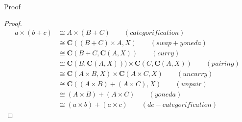 \documentclass[tikz]{beamer}
\theoremstyle{definition}
\begin{document}
\begin{frame}{Proof}
 \begin{proof}{}
 \begin{align*}
     a \times (b + c) &\cong A \times (B + C) \qquad (categorification) \\
                      &\cong \mathbf{C}((B + C) \times A, X) \qquad (swap + yoneda) \\
                      &\cong \mathbf{C}(B + C, \mathbf{C}(A, X)) \qquad (curry)\\
                      &\cong \mathbf{C}(B, \mathbf{C}(A, X)))   \times \mathbf{C}(C, \mathbf{C}(A, X)) \qquad (pairing) \\
                      &\cong \mathbf{C}(A\times B, X) \times \mathbf{C}(A\times C, X) \qquad (uncurry) \\
                      &\cong \mathbf{C}((A \times B) + (A \times C), X) \qquad (unpair)\\
                      &\cong (A \times B) + (A \times C) \qquad (yoneda) \\
                      &\cong (a \times b) + (a \times c) \qquad (de-categorification)
 \end{align*}{}
 \end{proof}
\end{frame}
\end{document}
